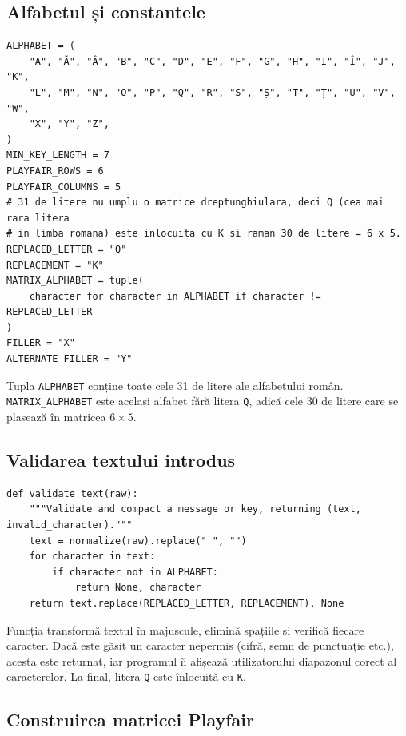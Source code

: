 \documentclass[12pt,a4paper]{article}
\begin{document}
\subsection{Alfabetul și constantele}

\begin{lstlisting}[caption={Alfabetul român și parametrii matricei}]
ALPHABET = (
    "A", "Ă", "Â", "B", "C", "D", "E", "F", "G", "H", "I", "Î", "J", "K",
    "L", "M", "N", "O", "P", "Q", "R", "S", "Ș", "T", "Ț", "U", "V", "W",
    "X", "Y", "Z",
)
MIN_KEY_LENGTH = 7
PLAYFAIR_ROWS = 6
PLAYFAIR_COLUMNS = 5
# 31 de litere nu umplu o matrice dreptunghiulara, deci Q (cea mai rara litera
# in limba romana) este inlocuita cu K si raman 30 de litere = 6 x 5.
REPLACED_LETTER = "Q"
REPLACEMENT = "K"
MATRIX_ALPHABET = tuple(
    character for character in ALPHABET if character != REPLACED_LETTER
)
FILLER = "X"
ALTERNATE_FILLER = "Y"
\end{lstlisting}

Tupla \texttt{ALPHABET} conține toate cele 31 de litere ale alfabetului român.
\texttt{MATRIX\_ALPHABET} este același alfabet fără litera \texttt{Q}, adică cele
30 de litere care se plasează în matricea $6 \times 5$.

\subsection{Validarea textului introdus}

\begin{lstlisting}[caption={Normalizarea și validarea textului}]
def validate_text(raw):
    """Validate and compact a message or key, returning (text, invalid_character)."""
    text = normalize(raw).replace(" ", "")
    for character in text:
        if character not in ALPHABET:
            return None, character
    return text.replace(REPLACED_LETTER, REPLACEMENT), None
\end{lstlisting}

Funcția transformă textul în majuscule, elimină spațiile și verifică fiecare
caracter. Dacă este găsit un caracter nepermis (cifră, semn de punctuație etc.),
acesta este returnat, iar programul îi afișează utilizatorului diapazonul corect
al caracterelor. La final, litera \texttt{Q} este înlocuită cu \texttt{K}.

\subsection{Construirea matricei Playfair}
\end{document}
